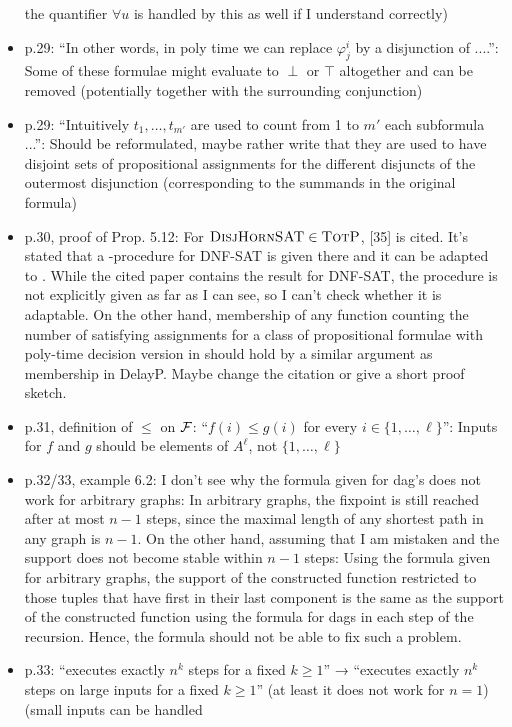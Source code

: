 \begin{itemize}
the quantifier $\forall u$ is handled by this as well if I understand correctly)
\item p.29: ``In other words, in poly time we can replace $\varphi_j^i$ by a disjunction of ....'': Some of these
formulae might evaluate to $\perp$ or $\top$ altogether and can be removed (potentially together with
the surrounding conjunction)
\item p.29: ``Intuitively $t_1,\ldots,t_{m'}$ are used to count from 1 to $m'$ each subformula ...'': Should be
reformulated, maybe rather write that they are used to have disjoint sets of propositional
assignments for the different disjuncts of the outermost disjunction (corresponding to the
summands in the original formula)
\item p.30, proof of Prop. 5.12: For $\textsc{DisjHornSAT} \in \text{\sc TotP}$, [35] is cited. It’s stated that a \totp-procedure
for DNF-SAT is given there and it can be adapted to \dhsat. While the
cited paper contains the result for DNF-SAT, the procedure is not explicitly given as far as
I can see, so I can't check whether it is adaptable. On the other hand, membership of any
function counting the number of satisfying assignments for a class of propositional formulae
with poly-time decision version in \totp should hold by a similar argument as membership in
DelayP. Maybe change the citation or give a short proof sketch.
\item p.31, definition of $\leq$ on $\mathcal{F}$: ``$f(i) \leq g(i)$ for every $i \in \{1,\ldots,\ell\}$'': Inputs for $f$ and $g$ should be
elements of $A^{\ell}$, not $\{1,\ldots,\ell\}$
\item p.32/33, example 6.2: I don't see why the formula given for dag's does not work for arbitrary
graphs: In arbitrary graphs, the fixpoint is still reached after at most $n-1$ steps, since the
maximal length of any shortest path in any graph is $n-1$. On the other hand, assuming that
I am mistaken and the support does not become stable within $n-1$ steps: Using the formula
given for arbitrary graphs, the support of the constructed function restricted to those tuples
that have first in their last component is the same as the support of the constructed function
using the formula for dags in each step of the recursion. Hence, the formula should not be
able to fix such a problem.
\item p.33: ``executes exactly $n^k$ steps for a fixed $k \geq 1$'' → ``executes exactly $n^k$
steps on large
inputs for a fixed $k \geq 1$'' (at least it does not work for $n = 1$) (small inputs can be handled

\end{itemize}
